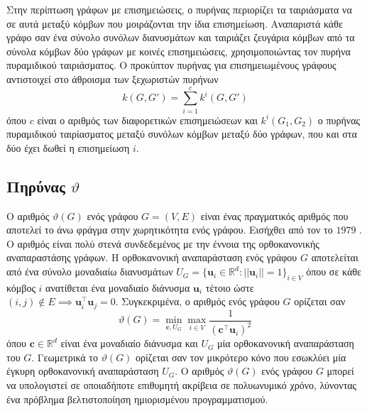 Στην περίπτωση γράφων με επισημειώσεις, ο πυρήνας περιορίζει τα ταιριάσματα να σε αυτά μεταξύ κόμβων που μοιράζονται την ίδια επισημείωση.
Αναπαριστά κάθε γράφο σαν ένα σύνολο συνόλων διανυσμάτων και ταιριάζει ζευγάρια κόμβων από τα σύνολα κόμβων δύο γράφων με κοινές επισημειώσεις, χρησιμοποιώντας τον πυρήνα πυραμιδικού ταιριάσματος.
Ο προκύπτον πυρήνας για επισημειωμένους γράφους αντιστοιχεί στο άθροισμα των ξεχωριστών πυρήνων
\begin{equation}
    k(G, G') = \sum_{i=1}^c k^i(G,G')
\end{equation}
όπου $c$ είναι ο αριθμός των διαφορετικών επισημειώσεων και $k^i(G_1,G_2)$ ο πυρήνας πυραμιδικού ταιρίασματος μεταξύ συνόλων κόμβων μεταξύ δύο γράφων, που και στα δύο έχει δωθεί η επισημείωση $i$.


\subsection{Πηρύνας  $\vartheta$}
Ο αριθμός  $\vartheta(G)$ ενός γράφου $G=(V,E)$ είναι ένας πραγματικός αριθμός που αποτελεί το άνω φράγμα στην χωρητικότητα  ενός γράφου.
Εισήχθει από τον  το $1979$ \cite{lovasz1979shannon}.
Ο αριθμός  είναι πολύ στενά συνδεδεμένος με την έννοια της ορθοκανονικής αναπαραστάσης γράφων.
Η ορθοκανονική αναπαράσταση ενός γράφου $G$ αποτελείται από ένα σύνολο μοναδιαίω διανυσμάτων $U_G = \{ \mathbf{u}_i \in \mathbb{R}^d : || \mathbf{u}_i || = 1 \}_{i \in V}$ όπου σε κάθε κόμβος $i$ ανατίθεται ένα μοναδιαίο διάνυσμα $\mathbf{u}_i$ τέτοιο ώστε $(i,j) \not \in E \implies \mathbf{u}_i^\top \mathbf{u}_j = 0$.
Συγκεκριμένα, ο αριθμός  ενός γράφου $G$ ορίζεται σαν
\begin{equation}
    \vartheta(G) = \min_{\mathbf{c}, U_G} \max_{i \in V} \frac{1}{(\mathbf{c}^\top \mathbf{u}_i)^2}
\end{equation}
όπου $\mathbf{c} \in \mathbb{R}^d$ είναι ένα μοναδιαίο διάνυσμα και $U_G$ μία ορθοκανονική αναπαράσταση του $G$. 
Γεωμετρικά το $\vartheta(G)$ ορίζεται σαν τον μικρότερο κόνο που εσωκλύει μία έγκυρη ορθοκανονική αναπαράσταση $U_G$.
Ο αριθμός  $\vartheta(G)$ ενός γράφου $G$ μπορεί να υπολογιστεί σε οποιαδήποτε επιθυμητή ακρίβεια σε πολυωνυμικό χρόνο, λύνοντας ένα πρόβλημα βελτιστοποίηση ημιορισμένου προγραμματισμού.

